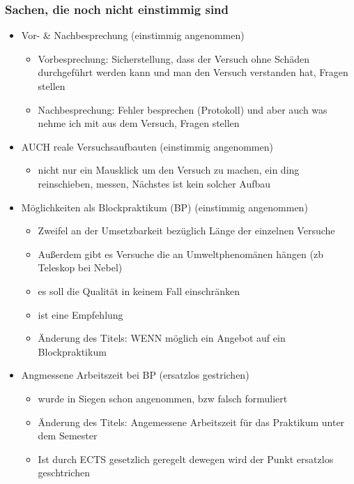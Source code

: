   \subsubsection{Sachen, die noch nicht einstimmig sind}

    \begin{itemize}
      \item Vor- \& Nachbesprechung (einstimmig angenommen)
        \begin{itemize}
          \item Vorbesprechung: Sicherstellung, dass der Versuch ohne Schäden durchgeführt werden kann und man den Versuch verstanden hat, Fragen stellen
          \item Nachbesprechung: Fehler besprechen (Protokoll) und aber auch was nehme ich mit aus dem Versuch, Fragen stellen
        \end{itemize}
      \item AUCH reale Versuchsaufbauten (einstimmig angenommen)
        \begin{itemize}
          \item nicht nur ein Mausklick um den Versuch zu machen, ein ding reinschieben, messen, Nächstes ist kein solcher Aufbau
        \end{itemize}
      \item Möglichkeiten als Blockpraktikum (BP) (einstimmig angenommen)
        \begin{itemize}
          \item Zweifel an der Umsetzbarkeit bezüglich Länge der einzelnen Versuche
          \item Außerdem gibt es Versuche die an Umweltphenomänen hängen (zb Teleskop bei Nebel)
          \item es soll die Qualität in keinem Fall einschränken
          \item ist eine Empfehlung
          \item Änderung des Titels: WENN möglich ein Angebot auf ein Blockpraktikum
        \end{itemize}
      \item Angmessene Arbeitszeit bei BP (ersatzlos gestrichen)
        \begin{itemize}
          \item wurde in Siegen schon angenommen, bzw falsch formuliert
          \item Änderung des Titels: Angemessene Arbeitszeit für das Praktikum unter dem Semester
          \item Ist durch ECTS gesetzlich geregelt dewegen wird der Punkt ersatzlos geschtrichen

\end{itemize}
\end{itemize}
